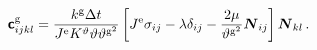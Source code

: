 \documentclass[10pt,letterpaper,oneside]{report}
\newcommand{\ten}[1]{\mbox{\boldmath $#1$}{}}
\newcommand{\tenf}[1]{\mbox{{\sffamily{\bfseries {#1}}}}}
\newcommand{\scas}[1]{\mbox{{\scriptsize{${\rm{#1}}$}}}{}}
\begin{document}
\begin{align}
\tenf{c}^{\scas{g}}_{ijkl} ={}& \frac{k^{\scas{g}} \Delta t}{J^{\scas{e}} K^\vartheta \vartheta \vartheta^{\scas{g}^2} } 
\left[ J^{\scas{e}} \sigma_{ij} - \lambda \delta_{ij} - \frac{2 \mu}{\vartheta^{\scas{g}^2}} \ten{N}_{ij} \right] 
\ten{N}_{kl} \, . 
\label{growth_tangent_fiber}
\end{align}
\end{document}
